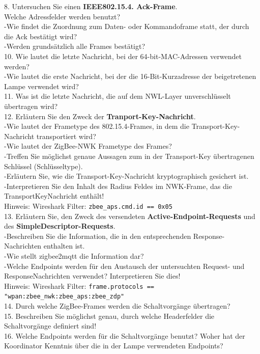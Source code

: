 \begin{Fragen}
    8. Untersuchen Sie einen \textbf{IEEE802.15.4. Ack-Frame}.\\
    Welche Adressfelder werden benutzt? \\
    -Wie findet die Zuordnung zum Daten- oder Kommandoframe statt, der durch die Ack bestätigt wird? \\
    -Werden grundsätzlich alle Frames bestätigt?\\
    
    10. Wie lautet die letzte Nachricht, bei der 64-bit-MAC-Adressen verwendet werden?\\
    -Wie lautet die erste Nachricht, bei der die 16-Bit-Kurzadresse der beigetretenen Lampe verwendet wird?\\
    
    11. Was ist die letzte Nachricht, die auf dem NWL-Layer unverschlüsselt übertragen wird?\\
    
    12. Erläutern Sie den Zweck der \textbf{Tranport-Key-Nachricht}.\\
    -Wie lautet der Frametype des 802.15.4-Frames, in dem die Transport-Key-Nachricht transportiert wird? \\
    -Wie lautet der ZigBee-NWK Frametype des Frames?\\
    -Treffen Sie möglichst genaue Aussagen zum in der Transport-Key übertragenen Schlüssel (Schlüsseltype). \\
    -Erläutern Sie, wie die Transport-Key-Nachricht kryptographisch gesichert ist.\\
    -Interpretieren Sie den Inhalt des Radius Feldes im NWK-Frame, das die TransportKeyNachricht enthält!\\
    Hinweis: Wireshark Filter: \verb|zbee_aps.cmd.id == 0x05|\\
    
    13. Erläutern Sie, den Zweck des versendeten \textbf{Active-Endpoint-Requests} und des \textbf{SimpleDescriptor-Requests}.\\
    -Beschreiben Sie die Information, die in den entsprechenden Response-Nachrichten enthalten ist.\\ 
    -Wie stellt zigbee2mqtt die Information dar?\\
    -Welche Endpoints werden für den Austausch der untersuchten Request- und ResponseNachrichten verwendet? Interpretieren Sie dies!\\
    Hinweis: Wireshark Filter: \verb|frame.protocols == "wpan:zbee_nwk:zbee_aps:zbee_zdp"|\\
     
    14. Durch welche ZigBee-Frames werden die Schaltvorgänge übertragen? \\
    
    15. Beschreiben Sie möglichst genau, durch welche Headerfelder die Schaltvorgänge definiert sind! \\
        
    16. Welche Endpoints werden für die Schaltvorgänge benutzt? Woher hat der Koordinator Kenntnis über die in der Lampe verwendeten Endpoints? \\
\end{Fragen}
